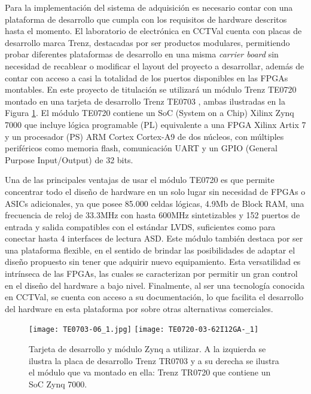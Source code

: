 		Para la implementación del sistema de adquisición es necesario contar con una plataforma de desarrollo que cumpla con los requisitos de hardware descritos hasta el momento. El laboratorio de electrónica en CCTVal cuenta con placas de desarrollo marca Trenz, destacadas por ser productos modulares, permitiendo probar diferentes plataformas de desarrollo en una misma \textit{carrier board} sin necesidad de recablear o modificar el layout del proyecto a desarrollar, además de contar con acceso a casi la totalidad de los puertos disponibles en las FPGAs montables. En este proyecto de titulación se utilizará un módulo Trenz TE0720 \cite{TrenzElectronic2020TE0720Wiki} montado en una tarjeta de desarrollo Trenz TE0703 \cite{TrenzElectronic2019TE0703Wiki}, ambas ilustradas en la Figura \ref{fig:trenz}. El módulo TE0720 contiene un SoC (System on a Chip) Xilinx Zynq 7000 \cite{Xilinx2012Zynq-7000Architecture} que incluye lógica programable (PL) equivalente a una FPGA Xilinx Artix 7\cite{Xilinx20107DS180} y un procesador (PS) ARM Cortex Cortex-A9 de dos núcleos, con múltiples periféricos como memoria flash, comunicación UART y un GPIO (General Purpose Input/Output) de 32 bits.
		
		Una de las principales ventajas de usar el módulo TE0720 es que permite concentrar todo el diseño de hardware en un solo lugar sin necesidad de FPGAs o ASICs adicionales, ya que posee 85.000 celdas lógicas, 4.9Mb de Block RAM, una frecuencia de reloj de 33.3MHz con hasta 600MHz sintetizables y 152 puertos de entrada y salida compatibles con el estándar LVDS, suficientes como para conectar hasta 4 interfaces de lectura ASD. Este módulo también destaca por ser una plataforma flexible, en el sentido de brindar las posibilidades de adaptar el diseño propuesto sin tener que adquirir nuevo equipamiento. Esta versatilidad es intrínseca de las FPGAs, las cuales se caracterizan por permitir un gran control en el diseño del hardware a bajo nivel. Finalmente, al ser una tecnología conocida en CCTVal, se cuenta con acceso a su documentación, lo que facilita el desarrollo del hardware en esta plataforma por sobre otras alternativas comerciales.
		
		\begin{figure}[H]
			\centering
			\texttt{[image: TE0703-06\_1.jpg]}
			\texttt{[image: TE0720-03-62I12GA-\_1]}
			\caption{Tarjeta de desarrollo y módulo Zynq a utilizar. A la izquierda se ilustra la placa de desarrollo Trenz TR0703\cite{TrenzElectronic2019TE0703Wiki} y a su derecha se ilustra el módulo que va montado en ella: Trenz TR0720\cite{TrenzElectronic2020TE0720Wiki} que contiene un SoC Zynq 7000\cite{}.}
			\label{fig:trenz}
		\end{figure}
	
